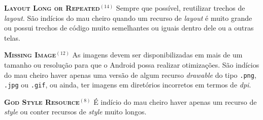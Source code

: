   \noindent
  \textbf{\textsc{{\small Layout Long or Repeated}}}$^{(14)}$
      Sempre que possível, reutilizar trechos de \textit{layout}. São indícios do mau cheiro quando um recurso de \textit{layout} é muito grande ou possui trechos de código muito semelhantes ou iguais dentro dele ou a outras telas.


  \noindent
  \textbf{\textsc{{\small Missing Image}}}$^{(12)}$
      As imagens devem ser disponibilizadas em mais de um tamanho ou resolução para que o Android possa realizar otimizações. São indícios do mau cheiro haver apenas uma versão de algum recurso \textit{drawable} do tipo \texttt{.png}, \texttt{.jpg} ou \texttt{.gif}, ou ainda, ter imagens em diretórios incorretos em termos de \textit{dpi}.


  \noindent
  \textbf{\textsc{{\small God Style Resource}}}$^{(8)}$
      É indício do mau cheiro haver apenas um recurso de \textit{style} ou conter recursos de \textit{style} muito longos.



